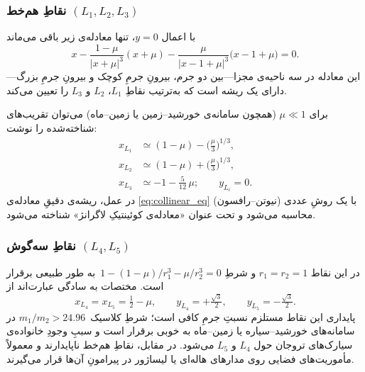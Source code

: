 


\subsubsection{نقاطِ هم‌خط \texorpdfstring{$(L_{1},L_{2},L_{3})$}{(L1,L2,L3)}}\label{subsec:collinear}

با اعمال $y=0$، تنها معادله‌ی زیر باقی می‌ماند
\begin{equation}\label{eq:collinear_eq}
	x-\frac{1-\mu}{|x+\mu|^{3}}(x+\mu)-\frac{\mu}{|x-1+\mu|^{3}}\bigl(x-1+\mu\bigr)=0.
\end{equation}
این معادله در سه ناحیه‌ی مجزا—بین دو جرم، بیرونِ جرمِ کوچک و بیرونِ جرمِ بزرگ—دارای یک ریشه است که به‌ترتیب نقاطِ $L_{1}$، $L_{2}$ و $L_{3}$ را تعیین می‌کند.

برای $\mu\ll1$ (همچون سامانه‌ی خورشید–زمین یا زمین–ماه) می‌توان تقریب‌های شناخته‌شده را نوشت:
\begin{align*}
	x_{L_{1}} &\simeq (1-\mu)-\bigl(\tfrac{\mu}{3}\bigr)^{1/3},\\
	x_{L_{2}} &\simeq (1-\mu)+\bigl(\tfrac{\mu}{3}\bigr)^{1/3},\\
	x_{L_{3}} &\simeq -1-\tfrac{5}{12}\,\mu; \qquad y_{L_{i}}=0.
\end{align*}
در عمل، ریشه‌ی دقیقِ معادله‌ی \eqref{eq:collinear_eq} با یک روشِ عددی (نیوتن–رافسون) محاسبه می‌شود و تحت عنوان «معادله‌ی کوئینتیکِ لاگرانژ» شناخته می‌شود\cite{battin1999astrodynamics}.

\subsubsection{نقاطِ سه‌گوش \texorpdfstring{$(L_{4},L_{5})$}{(L4,L5)}}\label{subsec:triangular}

در این نقاط $r_{1}=r_{2}=1$ و شرطِ
\(1-(1-\mu)/r_{1}^{3}-\mu/r_{2}^{3}=0\)\, به طور طبیعی برقرار است. مختصات به سادگی عبارت‌اند از
\begin{equation}
	x_{L_{4}}=x_{L_{5}}=\tfrac12-\mu,\qquad
	y_{L_{4}}=+\tfrac{\sqrt3}{2},\qquad
	y_{L_{5}}=-\tfrac{\sqrt3}{2}.
\end{equation}
پایداری این نقاط مستلزم نسبتِ جرمِ کافی است؛ شرطِ کلاسیک~$m_{1}/m_{2}>24.96$ در سامانه‌های خورشید–سیاره یا زمین–ماه به خوبی برقرار است و سببِ وجودِ خانواده‌ی سیارک‌های تروجان حول $L_{4}$ و $L_{5}$ می‌شود. در مقابل، نقاطِ هم‌خط ناپایدارند و معمولاً مأموریت‌های فضایی روی مدارهای هاله‌ای یا لیساژور در پیرامونِ آن‌ها قرار می‌گیرند.

